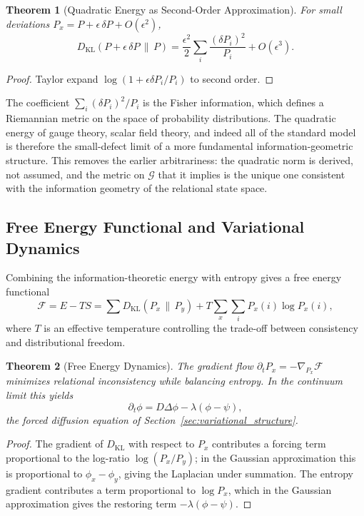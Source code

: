 \documentclass[12pt,a4paper,openany]{book}
\theoremstyle{plain}
\newtheorem{theorem}{Theorem}[chapter]
\theoremstyle{definition}
\theoremstyle{remark}
\begin{document}
\begin{theorem}[Quadratic Energy as Second-Order Approximation]
For small deviations $P_x = P + \epsilon\,\delta P + O(\epsilon^2)$,
\[
D_{\mathrm{KL}}(P+\epsilon\,\delta P \,\|\, P) = \frac{\epsilon^2}{2}\sum_i\frac{(\delta P_i)^2}{P_i} + O(\epsilon^3).
\]
\end{theorem}

\begin{proof}
Taylor expand $\log(1+\epsilon\delta P_i/P_i)$ to second order.
\end{proof}

The coefficient $\sum_i(\delta P_i)^2/P_i$ is the Fisher information, which defines a Riemannian metric on the space of probability distributions. The quadratic energy of gauge theory, scalar field theory, and indeed all of the standard model is therefore the small-defect limit of a more fundamental information-geometric structure. This removes the earlier arbitrariness: the quadratic norm is derived, not assumed, and the metric on $\mathcal{G}$ that it implies is the unique one consistent with the information geometry of the relational state space.

\subsection{Free Energy Functional and Variational Dynamics}

Combining the information-theoretic energy with entropy gives a free energy functional
\[
\mathcal{F} = E - TS = \sum D_{\mathrm{KL}}(P_x \,\|\, P_y) + T\sum_x \sum_i P_x(i)\log P_x(i),
\]
where $T$ is an effective temperature controlling the trade-off between consistency and distributional freedom.

\begin{theorem}[Free Energy Dynamics]
The gradient flow $\partial_t P_x = -\nabla_{P_x}\mathcal{F}$ minimizes relational inconsistency while balancing entropy. In the continuum limit this yields
\[
\partial_t\phi = D\Delta\phi - \lambda(\phi - \psi),
\]
the forced diffusion equation of Section~\ref{sec:variational_structure}.
\end{theorem}

\begin{proof}
The gradient of $D_{\mathrm{KL}}$ with respect to $P_x$ contributes a forcing term proportional to the log-ratio $\log(P_x/P_y)$; in the Gaussian approximation this is proportional to $\phi_x - \phi_y$, giving the Laplacian under summation. The entropy gradient contributes a term proportional to $\log P_x$, which in the Gaussian approximation gives the restoring term $-\lambda(\phi - \psi)$.
\end{proof}
\end{document}
